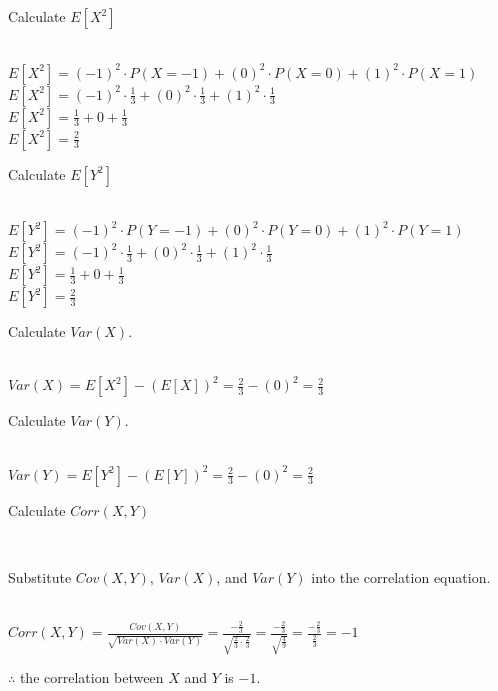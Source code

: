 \documentclass{article}
\begin{document}
\parbox{\textwidth}{Calculate $E[X^2]$}\\

$E[X^2] = (-1)^2 \cdot P(X = -1) + (0)^2 \cdot P(X = 0) + (1)^2 \cdot P(X = 1)$\\

$E[X^2] = (-1)^2 \cdot \frac{1}{3} + (0)^2 \cdot \frac{1}{3} + (1)^2 \cdot \frac{1}{3}$\\

$E[X^2] = \frac{1}{3} + 0 + \frac{1}{3}$\\

$E[X^2] = \frac{2}{3}$\\

\parbox{\textwidth}{Calculate $E[Y^2]$}\\

$E[Y^2] = (-1)^2 \cdot P(Y = -1) + (0)^2 \cdot P(Y= 0) + (1)^2 \cdot P(Y= 1)$\\

$E[Y^2] = (-1)^2 \cdot \frac{1}{3} + (0)^2 \cdot \frac{1}{3} + (1)^2 \cdot \frac{1}{3}$\\

$E[Y^2] = \frac{1}{3} + 0 + \frac{1}{3}$\\

$E[Y^2] = \frac{2}{3}$\\


\parbox{\textwidth}{Calculate $Var(X)$.}\\

$Var(X) = E[X^2] - (E[X])^2 = \frac{2}{3} - (0)^2 = \frac{2}{3}$\\

\parbox{\textwidth}{Calculate $Var(Y)$.}\\

$Var(Y) = E[Y^2] - (E[Y])^2 = \frac{2}{3} - (0)^2 = \frac{2}{3}$\\

\parbox{\textwidth}{Calculate $Corr(X,Y)$}\\

\parbox{\textwidth}{Substitute $Cov(X,Y)$, $Var(X)$, and $Var(Y)$ into the correlation equation.}\\

$Corr(X,Y) = \frac{Cov(X,Y)}{\sqrt{Var(X) \cdot Var(Y)}} = \frac{-\frac{2}{3}}{\sqrt{\frac{2}{3} \cdot \frac{2}{3}}} = \frac{-\frac{2}{3}}{\sqrt{\frac{4}{9}}} = \frac{-\frac{2}{3}}{\frac{2}{3}} = -1$\\

\parbox{\textwidth}{$\therefore$ the correlation between $X$ and $Y$ is $-1$.}\\
\end{document}
